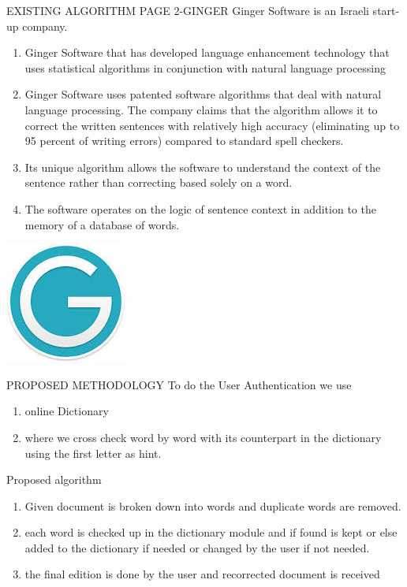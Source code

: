 \documentclass{beamer}
\begin{document}
\begin{frame}{EXISTING ALGORITHM PAGE 2-GINGER}
 Ginger Software is an Israeli start-up company.
 \begin{enumerate}
 
 \item Ginger Software that has developed language enhancement technology that uses statistical algorithms in conjunction with natural language processing

\item Ginger Software uses patented software algorithms that deal with natural language processing. The company claims that the algorithm allows it to correct the written sentences with relatively high accuracy (eliminating up to 95 percent of writing errors) compared to standard spell checkers. \item Its unique algorithm allows the software to understand the context of the sentence rather than correcting based solely on a word. 
\item The software operates on the logic of sentence context in addition to the memory of a database of words.

\end{enumerate}

\end{frame}
\begin{frame}
\includegraphics[scale=0.5]{ginger.jpeg} 
\end{frame}



\begin{frame}{PROPOSED METHODOLOGY}
To do the User Authentication we use
\begin{enumerate}
\item online Dictionary
\item where we cross check word by word with its counterpart in the dictionary using the first letter as hint.
\end{enumerate}
\end{frame}
\begin{frame}{Proposed algorithm}
 \begin{enumerate}
 
 \item Given document is broken down into words and duplicate words are removed.
\item each word is checked up in the dictionary module and if found is kept or else added to the dictionary if needed or changed by the user if not needed. 
\item the final edition is done by the user and recorrected document is received

\end{enumerate}

\end{frame}
\end{document}
